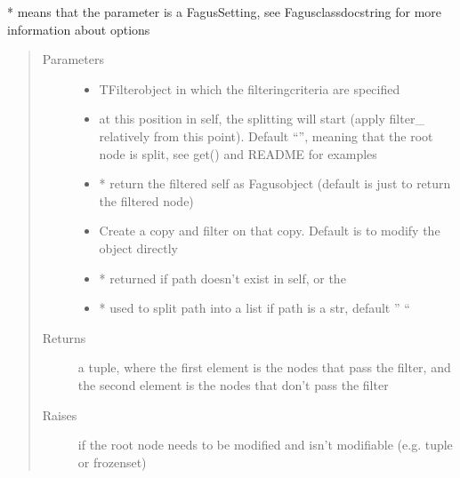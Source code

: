 \documentclass[a4paper,10pt,english]{sphinxmanual}
\begin{document}
\begin{fulllineitems}
\begin{fulllineitems}
\sphinxAtStartPar
* means that the parameter is a Fagus\sphinxhyphen{}Setting, see Fagus\sphinxhyphen{}class\sphinxhyphen{}docstring for more information about options
\begin{quote}\begin{description}
\item[{Parameters}] \leavevmode\begin{itemize}
\item {}
\sphinxAtStartPar
{} \textendash{} TFilter\sphinxhyphen{}object in which the filtering\sphinxhyphen{}criteria are specified

\item {}
\sphinxAtStartPar
{} \textendash{} at this position in self, the splitting will start (apply filter\_ relatively from this point).
Default “”, meaning that the root node is split, see get() and README for examples

\item {}
\sphinxAtStartPar
{} \textendash{} * return the filtered self as Fagus\sphinxhyphen{}object (default is just to return the filtered node)

\item {}
\sphinxAtStartPar
{} \textendash{} Create a copy and filter on that copy. Default is to modify the object directly

\item {}
\sphinxAtStartPar
{} \textendash{} * returned if path doesn’t exist in self, or the

\item {}
\sphinxAtStartPar
{} \textendash{} * used to split path into a list if path is a str, default ” “

\end{itemize}

\item[{Returns}] \leavevmode
\sphinxAtStartPar
a tuple, where the first element is the nodes that pass the filter, and the second element is the nodes that
don’t pass the filter

\item[{Raises}] \leavevmode
\sphinxAtStartPar
{} \textendash{} if the root node needs to be modified and isn’t modifiable (e.g. tuple or frozenset)


\end{description}
\end{quote}
\end{fulllineitems}
\end{fulllineitems}
\end{document}
